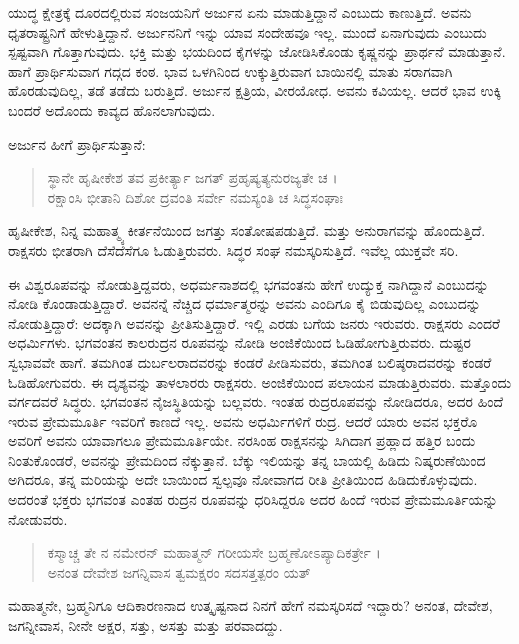 ಯುದ್ಧ ಕ್ಷೇತ್ರಕ್ಕೆ ದೂರದಲ್ಲಿರುವ ಸಂಜಯನಿಗೆ ಅರ್ಜುನ ಏನು ಮಾಡುತ್ತಿದ್ದಾನೆ ಎಂಬುದು ಕಾಣುತ್ತಿದೆ. ಅವನು ಧೃತರಾಷ್ಟ್ರನಿಗೆ ಹೇಳುತ್ತಿದ್ದಾನೆ. ಅರ್ಜುನನಿಗೆ ಇನ್ನು ಯಾವ ಸಂದೇಹವೂ ಇಲ್ಲ. ಮುಂದೆ ಏನಾಗುವುದು ಎಂಬುದು ಸ್ಪಷ್ಟವಾಗಿ ಗೊತ್ತಾಗುವುದು. ಭಕ್ತಿ ಮತ್ತು ಭಯದಿಂದ ಕೈಗಳನ್ನು ಜೋಡಿಸಿಕೊಂಡು ಕೃಷ್ಣನನ್ನು ಪ್ರಾರ್ಥನೆ ಮಾಡುತ್ತಾನೆ. ಹಾಗೆ ಪ್ರಾರ್ಥಿಸುವಾಗ ಗದ್ಗದ ಕಂಠ. ಭಾವ ಒಳಗಿನಿಂದ ಉಕ್ಕುತ್ತಿರುವಾಗ ಬಾಯಿನಲ್ಲಿ ಮಾತು ಸರಾಗವಾಗಿ ಹೊರಡುವುದಿಲ್ಲ, ತಡೆ ತಡೆದು ಬರುತ್ತಿದೆ. ಅರ್ಜುನ ಕ್ಷತ್ರಿಯ, ವೀರಯೋಧ. ಅವನು ಕವಿಯಲ್ಲ. ಆದರೆ ಭಾವ ಉಕ್ಕಿ ಬಂದರೆ ಅದೊಂದು ಕಾವ್ಯದ ಹೊನಲಾಗುವುದು.

ಅರ್ಜುನ ಹೀಗೆ ಪ್ರಾರ್ಥಿಸುತ್ತಾನೆ:

\begin{verse}
ಸ್ಥಾನೇ ಹೃಷೀಕೇಶ ತವ ಪ್ರಕೀರ್ತ್ಯಾ ಜಗತ್ ಪ್ರಹೃಷ್ಯತ್ಯನುರಜ್ಯತೇ ಚ ।\\ರಕ್ಷಾಂಸಿ ಭೀತಾನಿ ದಿಶೋ ದ್ರವಂತಿ ಸರ್ವೇ ನಮಸ್ಯಂತಿ ಚ ಸಿದ್ಧಸಂಘಾಃ 
\end{verse}

{\small ಹೃಷೀಕೇಶ, ನಿನ್ನ ಮಹಾತ್ಮ್ಯ ಕೀರ್ತನೆಯಿಂದ ಜಗತ್ತು ಸಂತೋಷಪಡುತ್ತಿದೆ. ಮತ್ತು ಅನುರಾಗವನ್ನು ಹೊಂದುತ್ತಿದೆ. ರಾಕ್ಷಸರು ಭೀತರಾಗಿ ದೆಸೆದೆಸೆಗೂ ಓಡುತ್ತಿರುವರು. ಸಿದ್ಧರ ಸಂಘ ನಮಸ್ಕರಿಸುತ್ತಿದೆ. ಇವೆಲ್ಲ ಯುಕ್ತವೇ ಸರಿ.}

ಈ ವಿಶ್ವರೂಪವನ್ನು ನೋಡುತ್ತಿದ್ದವರು, ಅಧರ್ಮನಾಶದಲ್ಲಿ ಭಗವಂತನು ಹೇಗೆ ಉದ್ಯುಕ್ತ ನಾಗಿದ್ದಾನೆ ಎಂಬುದನ್ನು ನೋಡಿ ಕೊಂಡಾಡುತ್ತಿದ್ದಾರೆ. ಅವನನ್ನೆ ನೆಚ್ಚಿದ ಧರ್ಮಾತ್ಮರನ್ನು ಅವನು ಎಂದಿಗೂ ಕೈ ಬಿಡುವುದಿಲ್ಲ ಎಂಬುದನ್ನು ನೋಡುತ್ತಿದ್ದಾರೆ: ಅದಕ್ಕಾಗಿ ಅವನನ್ನು ಪ್ರೀತಿಸುತ್ತಿದ್ದಾರೆ. ಇಲ್ಲಿ ಎರಡು ಬಗೆಯ ಜನರು ಇರುವರು. ರಾಕ್ಷಸರು ಎಂದರೆ ಅಧರ್ಮಿಗಳು. ಭಗವಂತನ ಕಾಲರುದ್ರನ ರೂಪವನ್ನು ನೋಡಿ ಅಂಜಿಕೆಯಿಂದ ಓಡಿಹೋಗುತ್ತಿರುವರು. ದುಷ್ಟರ ಸ್ವಭಾವವೇ ಹಾಗೆ. ತಮಗಿಂತ ದುರ್ಬಲರಾದವರನ್ನು ಕಂಡರೆ ಪೀಡಿಸುವರು, ತಮಗಿಂತ ಬಲಿಷ್ಠರಾದವರನ್ನು ಕಂಡರೆ ಓಡಿಹೋಗುವರು. ಈ ದೃಶ್ಯವನ್ನು ತಾಳಲಾರರು ರಾಕ್ಷಸರು. ಅಂಜಿಕೆಯಿಂದ ಪಲಾಯನ ಮಾಡುತ್ತಿರುವರು. ಮತ್ತೊಂದು ವರ್ಗದವರೆ ಸಿದ್ಧರು. ಭಗವಂತನ ನೈಜಸ್ಥಿತಿಯನ್ನು ಬಲ್ಲವರು. ಇಂತಹ ರುದ್ರರೂಪವನ್ನು ನೋಡಿದರೂ, ಅದರ ಹಿಂದೆ ಇರುವ ಪ್ರೇಮಮೂರ್ತಿ ಇವರಿಗೆ ಕಾಣದೆ ಇಲ್ಲ. ಅವನು ಅಧರ್ಮಿಗಳಿಗೆ ರುದ್ರ. ಆದರೆ ಯಾರು ಅವನ ಭಕ್ತರೊ ಅವರಿಗೆ ಅವನು ಯಾವಾಗಲೂ ಪ್ರೇಮಮೂರ್ತಿಯೇ. ನರಸಿಂಹ ರಾಕ್ಷಸನನ್ನು ಸಿಗಿದಾಗ ಪ್ರಹ್ಲಾದ ಹತ್ತಿರ ಬಂದು ನಿಂತುಕೊಂಡರೆ, ಅವನನ್ನು ಪ್ರೇಮದಿಂದ ನೆಕ್ಕುತ್ತಾನೆ. ಬೆಕ್ಕು ಇಲಿಯನ್ನು ತನ್ನ ಬಾಯಲ್ಲಿ ಹಿಡಿದು ನಿಷ್ಕರುಣೆಯಿಂದ ಅಗಿದರೂ, ತನ್ನ ಮರಿಯನ್ನು ಅದೇ ಬಾಯಿಂದ ಸ್ವಲ್ಪವೂ ನೋವಾಗದ ರೀತಿ ಪ್ರೀತಿಯಿಂದ ಹಿಡಿದುಕೊಳ್ಳುವುದು. ಅದರಂತೆ ಭಕ್ತರು ಭಗವಂತ ಎಂತಹ ರುದ್ರನ ರೂಪವನ್ನು ಧರಿಸಿದ್ದರೂ ಅದರ ಹಿಂದೆ ಇರುವ ಪ್ರೇಮಮೂರ್ತಿಯನ್ನು ನೋಡುವರು.

\begin{verse}
ಕಸ್ಮಾಚ್ಚ ತೇ ನ ನಮೇರನ್ ಮಹಾತ್ಮನ್ ಗರೀಯಸೇ ಬ್ರಹ್ಮಣೋಽಪ್ಯಾದಿಕರ್ತ್ರೇ ।\\ಅನಂತ ದೇವೇಶ ಜಗನ್ನಿವಾಸ ತ್ವಮಕ್ಷರಂ ಸದಸತ್ತತ್ಪರಂ ಯತ್ 
\end{verse}

{\small ಮಹಾತ್ಮನೇ, ಬ್ರಹ್ಮನಿಗೂ ಆದಿಕಾರಣನಾದ ಉತ್ಕೃಷ್ಟನಾದ ನಿನಗೆ ಹೇಗೆ ನಮಸ್ಕರಿಸದೆ ಇದ್ದಾರು? ಅನಂತ, ದೇವೇಶ, ಜಗನ್ನೀವಾಸ, ನೀನೇ ಅಕ್ಷರ, ಸತ್ತು, ಅಸತ್ತು ಮತ್ತು ಪರವಾದದ್ದು.}

